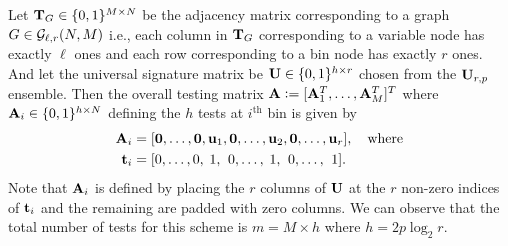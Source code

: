  Let $\mathbf{T}_{G}\in\{0,1\}^{M\times N }$ be the adjacency matrix corresponding to a graph $G\in\mathcal{G}_{\ell,r}(N,M)$ i.e., each column in $\mathbf{T}_{G}$ corresponding to a variable node has exactly $\ell$ ones and each row corresponding to a bin node has exactly $r$ ones. And let the universal signature matrix be $\mathbf{U}\in\{0,1\}^{h \times r}$ chosen from the $\mathbf{U}_{r,p}$ ensemble. Then the overall testing matrix $\mathbf{A}\mathrel{\mathop:}= [\mathbf{A}_{1}^{T},\ldots,\mathbf{A}_{M}^{T}]^T$ where $\mathbf{A}_{i}\in\{0,1\}^{h\times N}$ defining the $h$ tests at $i^{\text{th}}$ bin is given by
 \begin{align}
 \mathbf{A}_i&=[\mathbf{0},\ldots,\mathbf{0},\mathbf{u}_1, \mathbf{0},\ldots, \mathbf{u}_2,\mathbf{0}, \ldots, \mathbf{u}_{r}],\quad \text{where}\label{Eqn:TestingMatrixDefn}\\
\mathbf{t}_i &= [0,\ldots,0,\hspace{0.6ex}1,\hspace{0.9ex} 0, \ldots,\hspace{0.6ex}1,\hspace{0.9ex}0, \ldots, \hspace{0.9ex}1].\nonumber
 \end{align}
Note that $\mathbf{A}_i$ is defined by placing the $r$ columns of $\mathbf{U}$ at the $r$ non-zero indices of $\mathbf{t}_i$ and the remaining are padded with zero columns. We can observe that the total number of tests for this scheme is $m=M\times h$ where $h=2p\log_2 r$.

